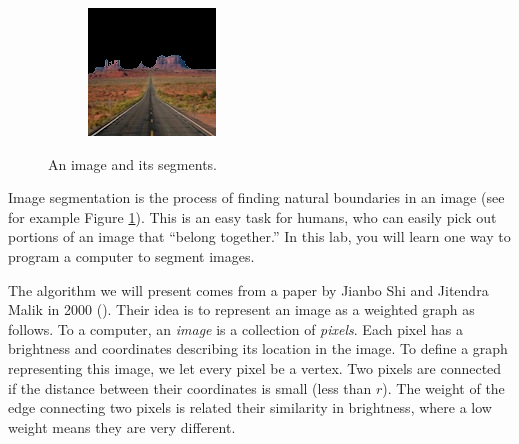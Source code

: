 \begin{figure}
\begin{subfigure}{0.31\textwidth}
    \end{subfigure}
    \hspace*{\fill}
    \begin{subfigure}{0.31\textwidth}
        \includegraphics[width=\textwidth]{PosMon.png}
    \end{subfigure}
    
\caption{An image and its segments.}
\label{fig:monument}
\end{figure}
Image segmentation is the process of finding natural boundaries in an image (see for example Figure \ref{fig:monument}).
This is an easy task for humans, who can easily pick out portions of an image that ``belong together.''
In this lab, you will learn one way to program a computer to segment images.

The algorithm we will present comes from a paper by Jianbo Shi and Jitendra Malik in 2000 (\cite{Shi2000}).
Their idea is to represent an image as a weighted graph as follows. 
To a computer, an \emph{image} is a collection of \emph{pixels}. 
Each pixel has a brightness and coordinates describing its location in the image.
To define a graph representing this image, we let every pixel be a vertex.
Two pixels are connected if the distance between their coordinates is small (less than $r$).
The weight of the edge connecting two pixels is related their similarity in brightness, where a low weight means they are very different.

